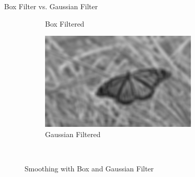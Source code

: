 \begin{frame}{Box Filter vs. Gaussian Filter}
\begin{figure}
\begin{subfigure}[b]{0.3\textwidth}
            \caption{Box Filtered}
            \label{sfi:box_vs_gaussian_box}
        \end{subfigure}
        \begin{subfigure}[b]{0.3\textwidth}
            \includegraphics[width=\textwidth]{./figures/box_vs_gaussian_gaussian.jpg}
            \caption{Gaussian Filtered}
            \label{sfi:sharpening_diff}
        \end{subfigure}\\
        \caption{Smoothing with Box and Gaussian Filter}\label{fi:smoothing_with_box_and_gaussian}
    \end{figure}
\end{frame}


